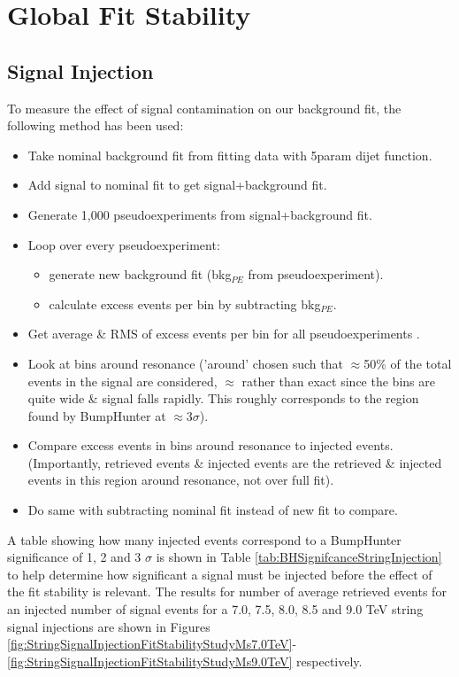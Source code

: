 \section{Global Fit Stability}
\subsection{Signal Injection}
To measure the effect of signal contamination on our background fit, the following method has been used:

\begin{itemize}
    \item Take nominal background fit from fitting data with 5param dijet function.
    \item Add signal to nominal fit to get signal+background fit.
    \item Generate 1,000 pseudoexperiments from signal+background fit.
    \item Loop over every pseudoexperiment:
    \begin{itemize}
        \item generate new background fit (bkg$_{PE}$ from pseudoexperiment).
        \item calculate excess events per bin by subtracting bkg$_{PE}$.
    \end{itemize}
    \item Get average \& RMS of excess events per bin for all pseudoexperiments .
    \item Look at bins around resonance ('around' chosen such that $\approx$50\% of the total events in the signal are considered, $\approx$ rather than exact since the bins are quite wide \& signal falls rapidly. This roughly corresponds to the region found by BumpHunter at $\approx$3$\sigma$).
    \item Compare excess events in bins around resonance to injected events. (Importantly, retrieved events \& injected events are the retrieved \& injected events in this region around resonance, not over full fit).
    \item Do same with subtracting nominal fit instead of new fit to compare.
\end{itemize}

A table showing how many injected events correspond to a BumpHunter significance of 1, 2 and 3 $\sigma$ is shown in Table \ref{tab:BHSignifcanceStringInjection} to help determine how significant a signal must be injected before the effect of the fit stability is relevant. The results for number of average retrieved events for an injected number of signal events  for a 7.0, 7.5, 8.0, 8.5 and 9.0 TeV string signal injections are shown in Figures \ref{fig:StringSignalInjectionFitStabilityStudyMs7.0TeV}-\ref{fig:StringSignalInjectionFitStabilityStudyMs9.0TeV} respectively. 

